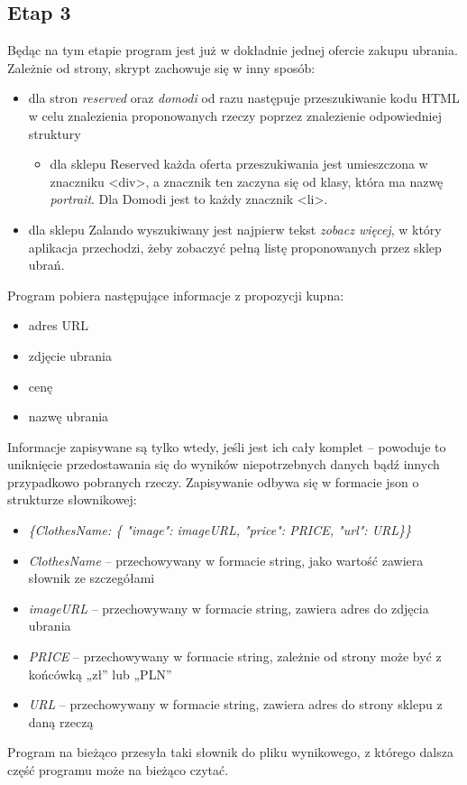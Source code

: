 \subsection{Etap 3}
	Będąc na tym etapie program jest już w dokładnie jednej ofercie zakupu ubrania. Zależnie od strony, skrypt zachowuje się w inny sposób:
\begin{itemize}
	 \item dla stron \emph{reserved} oraz \emph{domodi} od razu następuje przeszukiwanie kodu HTML w celu znalezienia proponowanych rzeczy poprzez znalezienie odpowiedniej struktury
		\begin{itemize} 
			\item dla sklepu Reserved każda oferta przeszukiwania jest umieszczona w znaczniku \textless div\textgreater, a znacznik ten zaczyna się od klasy, która ma nazwę \emph{portrait}. Dla Domodi jest to każdy 	znacznik \textless li\textgreater.
		\end{itemize}
	\item dla sklepu Zalando wyszukiwany jest najpierw tekst \emph{zobacz więcej}, w który aplikacja przechodzi, żeby zobaczyć pełną listę proponowanych przez sklep ubrań.
\end{itemize}
Program pobiera następujące informacje z propozycji kupna:
\begin{itemize}
	\item adres URL
	\item zdjęcie ubrania
	\item cenę
	\item nazwę ubrania
\end{itemize}
Informacje zapisywane są tylko wtedy, jeśli jest ich cały komplet – powoduje to uniknięcie przedostawania się do wyników niepotrzebnych danych bądź innych przypadkowo pobranych rzeczy.
Zapisywanie odbywa się w formacie json o strukturze słownikowej:
\begin{itemize}
\item[] \emph{\{ClothesName: \{ "image": imageURL, "price": PRICE, "url": URL\}\}}
\item[] \emph{ClothesName} – przechowywany w formacie string, jako wartość zawiera słownik ze szczegółami
\item[] \emph{imageURL} – przechowywany w formacie string, zawiera adres do zdjęcia ubrania
\item[] \emph{PRICE} – przechowywany w formacie string, zależnie od strony może być z końcówką „zł” lub 	„PLN”
\item[] \emph{URL} – przechowywany w formacie string, zawiera adres do strony sklepu z daną rzeczą
\end{itemize}
Program na bieżąco przesyła taki słownik do pliku wynikowego, z którego dalsza część programu może na bieżąco czytać.


